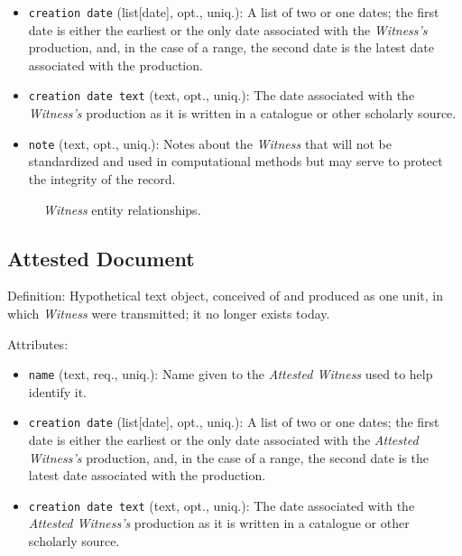 \begin{itemize}
    \item \texttt{creation date} (list[date], opt., uniq.): A list of two or one dates; the first date is either the earliest or the only date associated with the \textit{Witness's} production, and, in the case of a range, the second date is the latest date associated with the production.
    \item \texttt{creation date text} (text, opt., uniq.): The date associated with the \textit{Witness's} production as it is written in a catalogue or other scholarly source.
    \item \texttt{note} (text, opt., uniq.): Notes about the \textit{Witness} that will not be standardized and used in computational methods but may serve to protect the integrity of the record.
\end{itemize}

\begin{figure}[ht]
    \begin{center}
        
    \end{center}
\label{fig:WitnessER}
\caption{\textit{Witness} entity relationships.}
\end{figure}


\subsection{Attested Document}

Definition: Hypothetical text object, conceived of and produced as one unit, in which \textit{Witness} were transmitted; it no longer exists today.

\vspace{1em}
\noindent Attributes:

\begin{itemize}
    \item \texttt{name} (text, req., uniq.): Name given to the \textit{Attested Witness} used to help identify it.
    \item \texttt{creation date} (list[date], opt., uniq.): A list of two or one dates; the first date is either the earliest or the only date associated with the \textit{Attested Witness's} production, and, in the case of a range, the second date is the latest date associated with the production.
    \item \texttt{creation date text} (text, opt., uniq.): The date associated with the \textit{Attested Witness's} production as it is written in a catalogue or other scholarly source.
\end{itemize}

